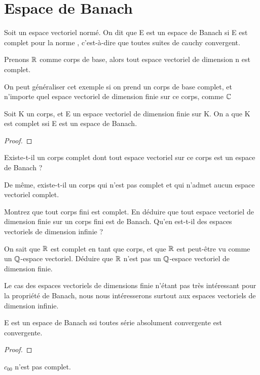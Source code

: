 \section{Espace de Banach}

\begin{definition} 
	Soit  un espace vectoriel normé. On dit que E
	est un espace de Banach si E est complet pour la norme ,
	c'est-à-dire que toutes suites de cauchy convergent.
\end{definition}

Prenons $\mathbb{R}$ comme corps de base, alors tout espace vectoriel de dimension n
est complet.

On peut généraliser cet exemple si on prend un corps de base complet, et
n'importe quel espace vectoriel de dimension finie sur ce corps, comme $\mathbb{C}$

\begin{proposition}
	Soit K un corps, et E un espace vectoriel de dimension finie sur K. On a que
	K est complet ssi E est un espace de Banach.
\end{proposition}

\begin{proof}
	
\end{proof}

\begin{question}
	Existe-t-il un corps complet dont tout espace vectoriel sur ce corps est un
	espace de Banach ?

	De même, existe-t-il un corps qui n'est pas complet et qui n'admet aucun
	espace vectoriel complet.
\end{question}

\begin{exercice}
	Montrez que tout corps fini est complet. En déduire que tout espace
	vectoriel de dimension finie sur un corps fini est de Banach. Qu'en est-t-il
	des espaces vectoriels de dimension infinie ?
\end{exercice}

\begin{exercice}
	On sait que $\mathbb{R}$ est complet en tant que corps, et que $\mathbb{R}$ est
	peut-être vu comme un $\mathbb{Q}$-espace vectoriel. Déduire que $\mathbb{R}$
	n'est pas un $\mathbb{Q}$-espace vectoriel de dimension finie.
\end{exercice}

Le cas des espaces vectoriels de dimensions finie n'étant pas très intéressant
pour la propriété de Banach, nous nous intéresserons surtout aux espaces
vectoriels de dimension infinie.

\begin{proposition}
	E est un espace de Banach ssi toutes série absolument convergente
	est convergente.
\end{proposition}

\begin{proof}
	
\end{proof}

\begin{exemple}
	$c_{00}$ n'est pas complet.
\end{exemple}
